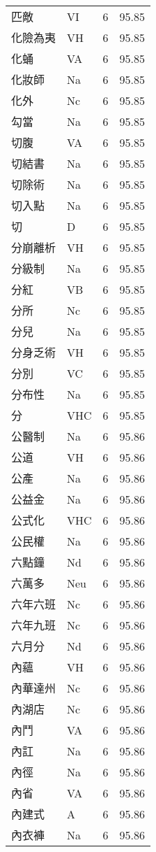 \documentclass[twocolumn]{book}
\begin{document}
\begin{supertabular}{llrr}
匹敵 & VI & 6 &  95.85\\
化險為夷 & VH & 6 &  95.85\\
化蛹 & VA & 6 &  95.85\\
化妝師 & Na & 6 &  95.85\\
化外 & Nc & 6 &  95.85\\
勾當 & Na & 6 &  95.85\\
切腹 & VA & 6 &  95.85\\
切結書 & Na & 6 &  95.85\\
切除術 & Na & 6 &  95.85\\
切入點 & Na & 6 &  95.85\\
切 & D & 6 &  95.85\\
分崩離析 & VH & 6 &  95.85\\
分級制 & Na & 6 &  95.85\\
分紅 & VB & 6 &  95.85\\
分所 & Nc & 6 &  95.85\\
分兒 & Na & 6 &  95.85\\
分身乏術 & VH & 6 &  95.85\\
分別 & VC & 6 &  95.85\\
分布性 & Na & 6 &  95.85\\
分 & VHC & 6 &  95.85\\
公醫制 & Na & 6 &  95.86\\
公道 & VH & 6 &  95.86\\
公產 & Na & 6 &  95.86\\
公益金 & Na & 6 &  95.86\\
公式化 & VHC & 6 &  95.86\\
公民權 & Na & 6 &  95.86\\
六點鐘 & Nd & 6 &  95.86\\
六萬多 & Neu & 6 &  95.86\\
六年六班 & Nc & 6 &  95.86\\
六年九班 & Nc & 6 &  95.86\\
六月分 & Nd & 6 &  95.86\\
內蘊 & VH & 6 &  95.86\\
內華達州 & Nc & 6 &  95.86\\
內湖店 & Nc & 6 &  95.86\\
內鬥 & VA & 6 &  95.86\\
內訌 & Na & 6 &  95.86\\
內徑 & Na & 6 &  95.86\\
內省 & VA & 6 &  95.86\\
內建式 & A & 6 &  95.86\\
內衣褲 & Na & 6 &  95.86\\

\end{supertabular}
\end{document}
